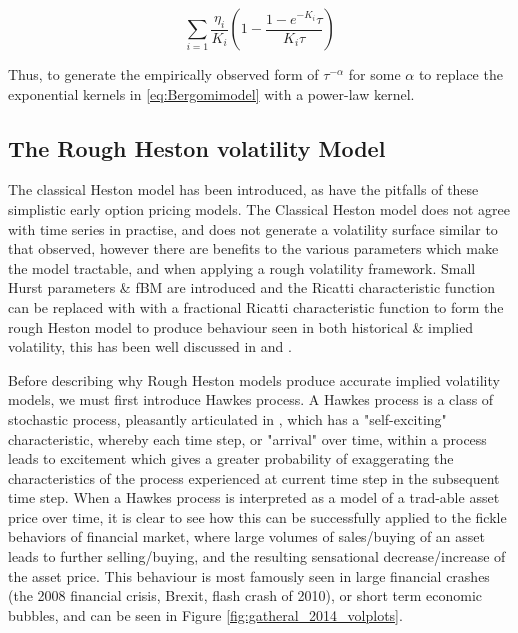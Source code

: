 \documentclass[12pt,oneside]{article}
\begin{document}
$$\sum_{i=1}^{} \frac{\eta_{i}}{K_{i}} (1- \frac{1-e^{-K_{i}} \tau}{{K_{i}} \tau})$$

Thus, to generate the empirically observed form of $\tau^{-\alpha}$ for some $\alpha$ to replace the exponential kernels in \ref{eq:Bergomimodel} with a power-law kernel.

\subsection{The Rough Heston volatility Model}
\label{sebsec:rough_heston}
The classical Heston model has been introduced, as have the pitfalls  of these simplistic early option pricing models. The Classical Heston model does not agree with time series in practise, and does not generate a volatility surface similar to that observed, however there are benefits to the various parameters which make the model tractable, and when applying a rough volatility framework. Small Hurst parameters & fBM are introduced and the Ricatti characteristic function can be replaced with with a fractional Ricatti characteristic function to form the rough Heston model to produce behaviour seen in both historical & implied volatility, this has been well discussed in \cite{OElEuch2018} and \cite{ElEuchRosenbaum19}.

Before describing why Rough Heston models produce accurate implied volatility models, we must first introduce Hawkes process. A Hawkes process is a class of stochastic process, pleasantly articulated in \cite{laub2015hawkes}, which has a "self-exciting" characteristic, whereby each time step, or "arrival" over time, within a process leads to excitement which gives a greater probability of exaggerating the characteristics of the process experienced at current time step in the subsequent time step. When a Hawkes process is interpreted as a model of a trad-able asset price over time, it is clear to see how this can be successfully applied to the fickle behaviors of financial market, where large volumes of sales/buying of an asset leads to further selling/buying, and the resulting sensational decrease/increase of the asset price. This behaviour is most famously seen in large financial crashes (the 2008 financial crisis, Brexit, flash crash of 2010), or short term economic bubbles, and can be seen in Figure \ref{fig:gatheral_2014_volplots}. 
\end{document}

